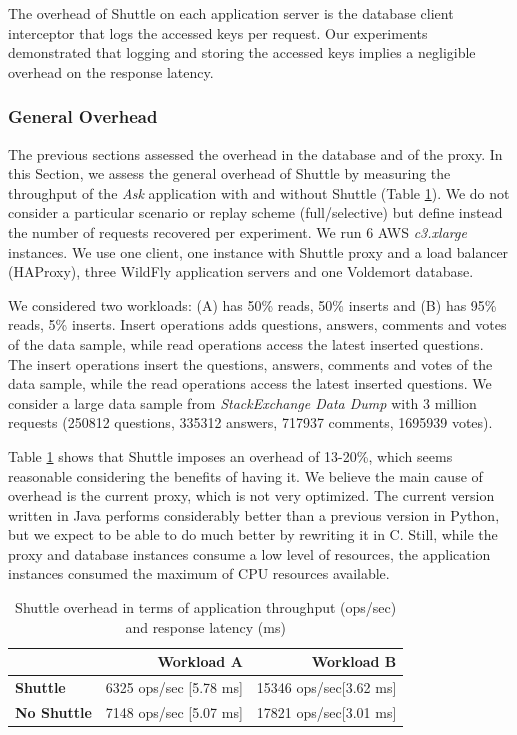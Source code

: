The overhead of Shuttle on each application server is the database client interceptor that logs the accessed keys per request. Our experiments demonstrated that logging and storing the accessed keys implies a negligible overhead on the response latency. 


\subsubsection{General Overhead}\label{sec:eval:performance:total}

The previous sections assessed the overhead in the database and of the proxy. In this Section, we assess the general overhead of Shuttle by measuring the throughput of the \textit{Ask} application with and without Shuttle (Table \ref{tab:throughput}). We do not consider a particular scenario or replay scheme (full/selective) but define instead the number of requests recovered per experiment. We run 6 \ac{AWS} \textit{c3.xlarge} instances. We use one client, one instance with Shuttle proxy and a load balancer (HAProxy), three WildFly application servers and one Voldemort database.

We considered two workloads: (A) has 50\% reads, 50\% inserts and (B) has 95\% reads, 5\% inserts. Insert operations adds questions, answers, comments and votes of the data sample, while read operations access the latest inserted questions. The insert operations insert the questions, answers, comments and votes of the data sample, while the read operations access the latest inserted questions. We consider a large data sample from \textit{StackExchange Data Dump} \cite{stackexchange_data} with 3 million requests (250812 questions, 335312 answers, 717937 comments, 1695939 votes).

Table \ref{tab:throughput} shows that Shuttle imposes an overhead of 13-20\%, which seems reasonable considering the benefits of having it. We believe the main cause of overhead is the current proxy, which is not very optimized. The current version written in Java performs considerably better than a previous version in Python, but we expect to be able to do much better by rewriting it in C. Still, while the proxy and database instances consume a low level of resources, the application instances consumed the maximum of CPU resources available.


\begin{table}
\centering
\begin{tabular}{l|rr}
                           &  \textbf{Workload A}   & \textbf{Workload B}  \\ \hline
\textbf{Shuttle}           &  6325 ops/sec [5.78 ms]  &  15346 ops/sec[3.62 ms]  \\
\textbf{No Shuttle}        &  7148 ops/sec [5.07 ms]  &  17821 ops/sec[3.01 ms]  \\
\end{tabular}
\caption{Shuttle overhead in terms of application throughput (ops/sec) and response latency (ms)}
\label{tab:throughput}
\end{table}

